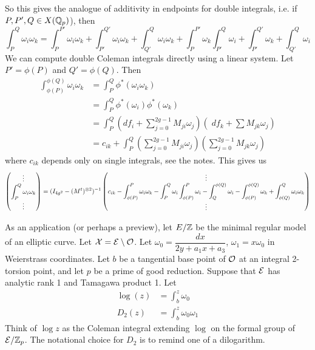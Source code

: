 So this gives the analogue of additivity in endpoints for double integrals, i.e. if $P,P',Q \in X(\mathbb{Q}_p)$), then
	\[
	\int_P^Q \omega_i \omega_k= \int_P^{P'} \omega_i \omega_k + \int_{P'}^{Q'} \omega_i \omega_k + \int_{Q'}^Q \omega_i \omega_k + \int_P^{P'} \omega_k \int_{P'}^Q \omega_i + \int_{P'}^{Q'} \omega_k + \int_{Q'}^Q \omega_i
	\]
We can compute double Coleman integrals directly using a linear system. Let $P'= \phi(P)$ and $Q'= \phi(Q)$. Then
	\[
	\begin{aligned}
	\int_{\phi(P)}^{\phi(Q)} \omega_i \omega_k&= \int_P^Q \phi^*(\omega_i \omega_k) \\
	&=\int_P^Q \phi^*(\omega_i) \phi^*(\omega_k) \\
	&= \int_P^Q (df_i + \sum_{j=0}^{2g-1} M_{ji} \omega_j )( \;df_k  + \sum M_{jk} \omega_j ) \\
	&= c_{ik} + \int_P^Q \left(\sum_{j=0}^{2g-1} M_{ji} \omega_j\right) \left(\sum_{j=0}^{2g-1} M_{jk} \omega_j \right)
	\end{aligned}
	\]
where $c_{ik}$ depends only on single integrals, see the notes. This gives us
	\[
	\begin{pmatrix}
	\vdots \\
	\displaystyle \int_P^Q \omega_i \omega_k \\
	\vdots
	\end{pmatrix}=
	(I_{4g^2} - (M^t)^{\otimes 2})^{-1}
	\begin{pmatrix}
	\vdots \\
	\displaystyle c_{ik} - \int_{\phi(P)}^{P} \omega_i \omega_k - \int_P^Q \omega_i \int_{\phi(P)}^P \omega_i - \int_Q^{\phi(Q)} \omega_i - \int_{\phi(P)}^{\phi(Q)} \omega_k + \int_{\phi(Q)}^Q \omega_i \omega_k \\
	\vdots
	\end{pmatrix}
	\]


As an application (or perhaps a preview), let $E/\mathbb{Z}$ be the minimal regular model of an elliptic curve. Let $\mathcal{X}= \mathcal{E} \setminus \mathcal{O}$. Let $\omega_0= \dfrac{dx}{2y+a_1x+a_3}$, $\omega_1= x\omega_0$ in Weierstrass coordinates. Let $b$ be a tangential base point of $\mathcal{O}$ at an integral 2-torsion point, and let $p$ be a prime of good reduction. Suppose that $\mathcal{E}$ has analytic rank 1 and Tamagawa product 1. Let
	\[
	\begin{aligned}
	\log(z)&= \int_b^z \omega_0 \\
	D_2(z)&= \int_b^z \omega_0 \omega_1
	\end{aligned}
	\]
Think of $\log z$ as the Coleman integral extending $\log$ on the formal group of $\mathcal{E}/\mathbb{Z}_p$. The notational choice for $D_2$ is to remind one of a dilogarithm. 


